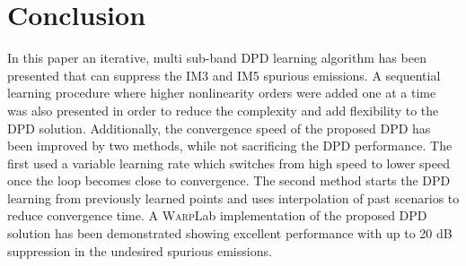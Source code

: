 




\section{Conclusion}
In this paper an iterative, multi sub-band DPD learning algorithm has been presented that can suppress the IM3 and IM5 spurious emissions. 
A sequential learning procedure where higher nonlinearity orders were added one at a time was also presented in order to reduce the complexity and add flexibility to the DPD solution. 
Additionally, the convergence speed of the proposed DPD has been improved by two methods, while not sacrificing the DPD performance. 
The first used a variable learning rate which switches from high speed to lower speed once the loop becomes close to convergence. 
The second method starts the DPD learning from previously learned points and uses interpolation of past scenarios to reduce convergence time. 
A \textsc{Warp}Lab implementation of the proposed DPD solution has been demonstrated showing excellent performance with up to 20 dB suppression in the undesired spurious emissions.


 

\iffalse %

